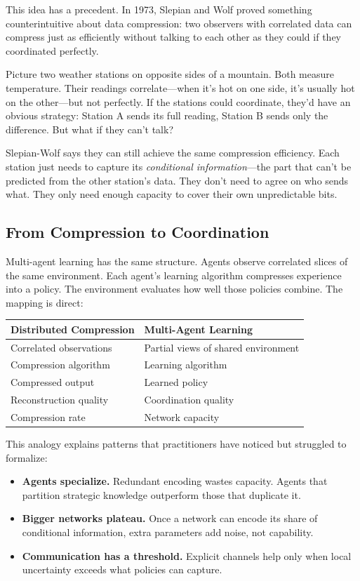 \documentclass[10pt, letterpaper]{article}
\begin{document}
This idea has a precedent. In 1973, Slepian and Wolf proved something counterintuitive about data compression: two observers with correlated data can compress just as efficiently without talking to each other as they could if they coordinated perfectly.

Picture two weather stations on opposite sides of a mountain. Both measure temperature. Their readings correlate---when it's hot on one side, it's usually hot on the other---but not perfectly. If the stations could coordinate, they'd have an obvious strategy: Station A sends its full reading, Station B sends only the difference. But what if they can't talk?

Slepian-Wolf says they can still achieve the same compression efficiency. Each station just needs to capture its \emph{conditional information}---the part that can't be predicted from the other station's data. They don't need to agree on who sends what. They only need enough capacity to cover their own unpredictable bits.

\subsection*{From Compression to Coordination}

Multi-agent learning has the same structure. Agents observe correlated slices of the same environment. Each agent's learning algorithm compresses experience into a policy. The environment evaluates how well those policies combine. The mapping is direct:

\begin{center}
\begin{tabular}{ll}
\toprule
\textbf{Distributed Compression} & \textbf{Multi-Agent Learning} \\
\midrule
Correlated observations & Partial views of shared environment \\
Compression algorithm & Learning algorithm \\
Compressed output & Learned policy \\
Reconstruction quality & Coordination quality \\
Compression rate & Network capacity \\
\bottomrule
\end{tabular}
\end{center}

This analogy explains patterns that practitioners have noticed but struggled to formalize:
\begin{itemize}
    \item \textbf{Agents specialize.} Redundant encoding wastes capacity. Agents that partition strategic knowledge outperform those that duplicate it.
    \item \textbf{Bigger networks plateau.} Once a network can encode its share of conditional information, extra parameters add noise, not capability.
    \item \textbf{Communication has a threshold.} Explicit channels help only when local uncertainty exceeds what policies can capture.
\end{itemize}
\end{document}
